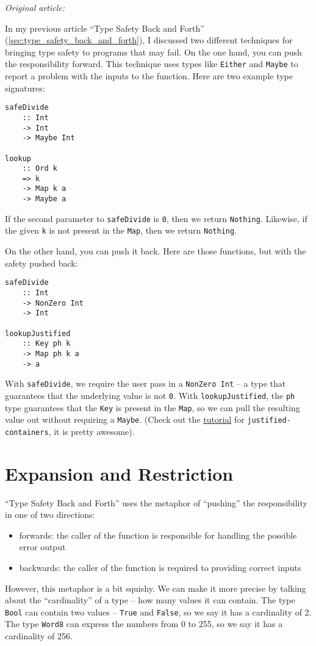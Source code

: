 \textit{Original article: \cite{keep_your_types_small}}

\vspace{\baselineskip}

\noindent In my previous article ``Type Safety Back and Forth'' (\ref{sec:type_safety_back_and_forth}), I discussed two different techniques for bringing type safety to programs that may fail. On the one hand, you can push the responsibility forward. This technique uses types like \texttt{Either} and \texttt{Maybe} to report a problem with the inputs to the function. Here are two example type signatures:

\begin{verbatim}
safeDivide
    :: Int
    -> Int
    -> Maybe Int

lookup
    :: Ord k
    => k
    -> Map k a
    -> Maybe a
\end{verbatim}
If the second parameter to \texttt{safeDivide} is \texttt{0}, then we return \texttt{Nothing}. Likewise, if the given \texttt{k} is not present in the \texttt{Map}, then we return \texttt{Nothing}.

On the other hand, you can push it back. Here are those functions, but with the safety pushed back:

\begin{verbatim}
safeDivide
    :: Int
    -> NonZero Int
    -> Int

lookupJustified
    :: Key ph k
    -> Map ph k a
    -> a
\end{verbatim}
With \texttt{safeDivide}, we require the user pass in a \texttt{NonZero Int} -- a type that guarantees that the underlying value is not \texttt{0}. With \texttt{lookupJustified}, the \texttt{ph} type guarantees that the \texttt{Key} is present in the \texttt{Map}, so we can pull the resulting value out without requiring a \texttt{Maybe}. (Check out the \href{https://hackage.haskell.org/package/justified-containers-0.3.0.0/docs/Data-Map-Justified-Tutorial.html}{tutorial} for \texttt{justified-containers}, it is pretty awesome).




\section{Expansion and Restriction}


``Type Safety Back and Forth'' uses the metaphor of ``pushing'' the responsibility in one of two directions:

\begin{itemize}
\item forwards: the caller of the function is responsible for handling the possible error output
\item backwards: the caller of the function is required to providing correct inputs
\end{itemize}
However, this metaphor is a bit squishy. We can make it more precise by talking about the ``cardinality'' of a type -- how many values it can contain. The type \texttt{Bool} can contain two values -- \texttt{True} and \texttt{False}, so we say it has a cardinality of 2. The type \texttt{Word8} can express the numbers from 0 to 255, so we say it has a cardinality of 256.

